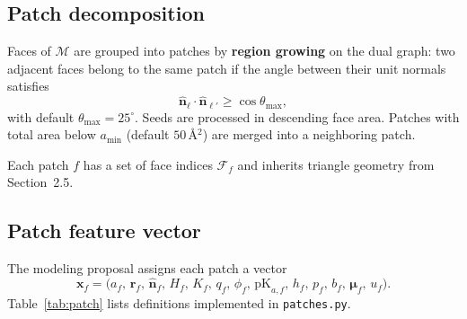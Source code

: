 \documentclass[11pt,a4paper]{article}
\begin{document}
\subsection{Patch decomposition}

Faces of $\mathcal{M}$ are grouped into patches by \textbf{region growing} on the
dual graph: two adjacent faces belong to the same patch if the angle between their
unit normals satisfies
\begin{equation}
  \hat{\mathbf{n}}_\ell \cdot \hat{\mathbf{n}}_{\ell'} \ge \cos\theta_{\max},
\end{equation}
with default $\theta_{\max}=25^\circ$. Seeds are processed in descending face area.
Patches with total area below $a_{\min}$ (default $50$\,\AA$^2$) are merged into a
neighboring patch.

Each patch $f$ has a set of face indices $\mathcal{F}_f$ and inherits triangle
geometry from Section~2.5.

\subsection{Patch feature vector}

The modeling proposal assigns each patch a vector
\begin{equation}
  \mathbf{x}_f
  = \bigl(
    a_f,\,
    \mathbf{r}_f,\,
    \hat{\mathbf{n}}_f,\,
    H_f,\,
    K_f,\,
    q_f,\,
    \phi_f,\,
    \mathrm{pK}_{a,f},\,
    h_f,\,
    p_f,\,
    b_f,\,
    \boldsymbol{\mu}_f,\,
    u_f
  \bigr).
\end{equation}
Table~\ref{tab:patch} lists definitions implemented in \texttt{patches.py}.
\end{document}
